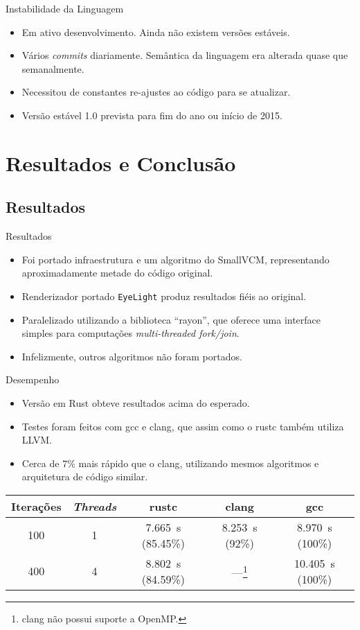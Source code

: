 \documentclass{beamer}
\begin{document}
\begin{frame}{Instabilidade da Linguagem}
	\begin{itemize}
		\item Em ativo desenvolvimento. Ainda não existem versões estáveis.
		\item Vários \emph{commits} diariamente. Semântica da linguagem era alterada quase que semanalmente.
		\item Necessitou de constantes re-ajustes ao código para se atualizar.
		\item Versão estável 1.0 prevista para fim do ano ou início de 2015.
	\end{itemize}
\end{frame}

\section{Resultados e Conclusão}
\subsection{Resultados}
\begin{frame}{Resultados}
	\begin{itemize}
		\item Foi portado infraestrutura e um algoritmo do SmallVCM, representando aproximadamente metade do código original.
		\item Renderizador portado \texttt{EyeLight} produz resultados fiéis ao original.
		\item Paralelizado utilizando a biblioteca ``rayon'', que oferece uma interface simples para computações \emph{multi-threaded fork/join}.
		\item Infelizmente, outros algoritmos não foram portados.
	\end{itemize}
\end{frame}

\begin{frame}{Desempenho}
	\begin{itemize}
		\item Versão em Rust obteve resultados acima do esperado.
		\item Testes foram feitos com gcc e clang, que assim como o rustc também utiliza LLVM.
		\item Cerca de 7\% mais rápido que o clang, utilizando mesmos algoritmos e arquitetura de código similar.
	\end{itemize}

	{\small
	\begin{tabular}{|c|c|c|c|c|} \hline
	Iterações & \emph{Threads} & rustc & clang & gcc \\ \hline
	100 & 1 & \SI{7.665}{\s} (85.45\%) & \SI{8.253}{\s} (92\%) & \SI{ 8.970}{\s} (100\%) \\
	400 & 4 & \SI{8.802}{\s} (84.59\%) & ---\footnote{clang não possui suporte a OpenMP.} & \SI{10.405}{\s} (100\%) \\ \hline
	\end{tabular}
	}
\end{frame}
\end{document}
